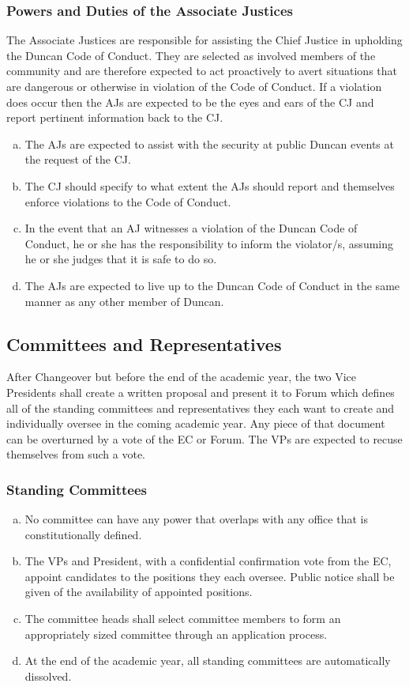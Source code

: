 \documentclass[USletter,12pt]{article}
\begin{document}
\begin{enumerate}[(a)]
\subsubsection{Powers and Duties of the Associate Justices}
The Associate Justices are responsible for assisting the Chief Justice in upholding the Duncan Code of Conduct.  They are selected as involved members of the community and are therefore expected to act proactively to avert situations that are dangerous or otherwise in violation of the Code of Conduct.  If a violation does occur then the AJs are expected to be the eyes and ears of the CJ and report pertinent information back to the CJ.
\begin{enumerate}[(a)]
\item The AJs are expected to assist with the security at public Duncan events at the request of the CJ.
\item The CJ should specify to what extent the AJs should report and themselves enforce violations to the Code of Conduct.
\item In the event that an AJ witnesses a violation of the Duncan Code of Conduct, he or she has the responsibility to inform the violator/s, assuming he or she judges that it is safe to do so.
\item The AJs are expected to live up to the Duncan Code of Conduct in the same manner as any other member of Duncan.
\end{enumerate}


\subsection{Committees and Representatives}

After Changeover but before the end of the academic year, the two Vice Presidents shall create a written proposal and present it to Forum which defines all of the standing committees and representatives they each want to create and individually oversee in the coming academic year.  Any piece of that document can be overturned by a vote of the EC or Forum.  The VPs are expected to recuse themselves from such a vote.

\subsubsection{Standing Committees}
\begin{enumerate}[(a)]
\item No committee can have any power that overlaps with any office that is constitutionally defined.
\item The VPs and President, with a confidential confirmation vote from the EC, appoint candidates to the positions they each oversee. 
Public notice shall be given of the availability of appointed positions.
\item The committee heads shall select committee members to form an appropriately sized committee through an application process.
\item At the end of the academic year, all standing committees are automatically dissolved.
\end{enumerate}


\end{enumerate}
\end{document}
